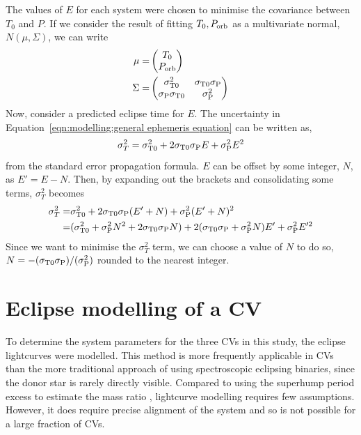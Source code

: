 The values of $E$ for each system were chosen to minimise the covariance between $T_0$ and $P$. 
If we consider the result of fitting  $T_0, P_{\rm orb}$ as a multivariate normal, $N(\mu, \Sigma)$, we can write
\begin{align}
    \mu =& 
    \begin{pmatrix}
        T_0 \\
        P_{\rm orb}
    \end{pmatrix}
    \\
    \label{eqn:modelling:ephemeris multivariate normal}
    \Sigma =& 
    \begin{pmatrix}
        \sigma_{\rm T0}^2 & \sigma_{\rm T0} \sigma_{\rm P} \\
        \sigma_{\rm P} \sigma_{\rm T0} & \sigma_{\rm P}^2  \\
    \end{pmatrix}
\end{align}
Now, consider a predicted eclipse time for $E$. The uncertainty in Equation~\ref{eqn:modelling:general ephemeris equation} can be written as,
\begin{equation}
    \sigma_T^2 = \sigma_{\rm T0}^2 + 2\sigma_{\rm T0} \sigma_{\rm P}E + \sigma_{\rm P}^2 E^2
\end{equation}
from the standard error propagation formula.
$E$ can be offset by some integer, $N$, as $E' = E - N$. Then, by expanding out the brackets and consolidating some terms, $\sigma_T^2$ becomes
\begin{align*}
    \sigma_T^2 =& \sigma_{\rm T0}^2 + 2\sigma_{\rm T0} \sigma_{\rm P}(E'+N) + \sigma_{\rm P}^2 (E'+N)^2 \\
    =& (\sigma_{\rm T0}^2 + \sigma_{\rm P}^2 N^2 + 2\sigma_{\rm T0} \sigma_{\rm P} N) + 2(\sigma_{\rm T0} \sigma_{\rm P} + \sigma_{\rm P}^2 N)E' + \sigma_{\rm P}^2 E'^2
\end{align*}
Since we want to minimise the $\sigma_T^2$ term, we can choose a value of $N$ to do so, $N = -(\sigma_{\rm T0}\sigma_{\rm P})/(\sigma_{\rm P}^2)$ rounded to the nearest integer.


\section{Eclipse modelling of a CV}
\label{sect:method:lightcurve modelling}

To determine the system parameters for the three CVs in this study, the eclipse lightcurves were modelled. This method is more frequently applicable in CVs than the more traditional approach of using spectroscopic eclipsing binaries, since the donor star is rarely directly visible. Compared to using the superhump period excess to estimate the mass ratio \citep{patterson2005, knigge2006}, lightcurve modelling requires few assumptions. However, it does require precise alignment of the system and so is not possible for a large fraction of CVs.

